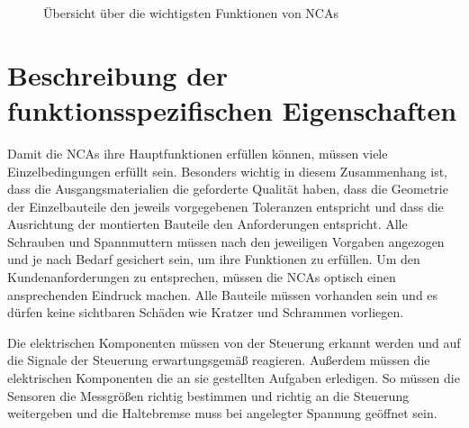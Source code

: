 \begin{figure}[H]
\center
{}
\caption{Übersicht über die wichtigsten Funktionen von NCAs}
\label{fig:Uebersicht_ueber_die_wichtigsten_Funktionen_von_NCAs}
\end{figure}






\section{Beschreibung der funktionsspezifischen Eigenschaften}

Damit die NCAs ihre Hauptfunktionen erfüllen können, müssen viele Einzelbedingungen erfüllt sein. Besonders wichtig in diesem Zusammenhang ist, dass die Ausgangsmaterialien die geforderte Qualität haben, dass die Geometrie der Einzelbauteile  den jeweils vorgegebenen Toleranzen entspricht und dass die Ausrichtung der montierten Bauteile den Anforderungen entspricht. Alle Schrauben und Spannmuttern müssen nach den jeweiligen Vorgaben angezogen und je nach Bedarf gesichert sein, um ihre Funktionen zu erfüllen. Um den Kundenanforderungen zu entsprechen, müssen die NCAs optisch einen ansprechenden Eindruck machen. Alle Bauteile müssen vorhanden sein und es dürfen keine sichtbaren Schäden wie Kratzer und Schrammen vorliegen. 

Die elektrischen Komponenten müssen von der Steuerung erkannt werden und auf die Signale der Steuerung erwartungsgemäß reagieren. Außerdem müssen die elektrischen Komponenten die an sie gestellten Aufgaben erledigen. So müssen die Sensoren die Messgrößen richtig bestimmen und richtig an die Steuerung weitergeben und die Haltebremse muss bei angelegter Spannung geöffnet sein.

